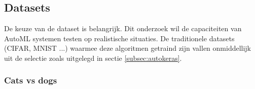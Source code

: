 
\chapter{}
\label{ch:methodologie}


\section{Datasets}
\label{sec:datasets}

De keuze van de dataset is belangrijk. Dit onderzoek wil de capaciteiten van AutoML systemen testen op realistische situaties. De traditionele datasets (CIFAR, MNIST ...) waarmee deze algoritmen getraind zijn vallen onmiddellijk uit de selectie zoals uitgelegd in sectie \ref{subsec:autokeras}.

\subsection{Cats vs dogs}
\label{subsec:catsvsdogs}


